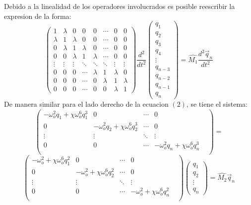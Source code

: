 \documentclass[11pt,letterpaper,twocolumn]{article}
\begin{document}
\par 
Debido a la linealidad de los operadores involucrados es posible reescribir la expresion de la forma: 
{\fontsize{8}{15}\selectfont
\begin{equation}
\left(
\begin{matrix}
1 & \lambda  & 0 & 0 & 0 & \cdots & 0 & 0 \\
\lambda & 1 & \lambda  & 0 & 0 & \cdots & 0 & 0\\
0 & \lambda  & 1 & \lambda   & 0 & \cdots & 0& 0 \\
0 & 0 & \lambda  & 1 & \lambda   & \cdots & 0 & 0 \\
\vdots & \vdots & \vdots & \ddots & \ddots & \ddots & \vdots & \vdots \\
0 & 0 & 0 & \cdots & \lambda  &  1 & \lambda &0\\    
0 & 0 & 0 & \cdots & 0 & \lambda  & 1 & \lambda\\    
0 & 0 & 0 & \cdots & 0 & 0 & \lambda  & 1    
\end{matrix} \right) \dfrac{d^2}{dt^2} \left(
\begin{matrix}
q_{1}\\
q_{2}\\
q_{3}\\
q_{4}\\
\vdots\\
q_{n-3}\\
q_{n-2}\\
q_{n-1}\\
q_{n}
\end{matrix} \right)  = \hat{M_{1}} \dfrac{d^{2} \vec{q}_{n}}{dt^{2}}
\end{equation} } 
De manera similar para el lado derecho de la ecuacion $(2)$, se tiene el sistema: 
{\fontsize{8}{15}\selectfont
$$ \left(
\begin{matrix}
- \omega_{o}^{2} q_{1} + \chi \omega_{o}^{6} q_{1}^{3} & 0 & \cdots & 0 \\
0  & - \omega_{o}^{2} q_{2} + \chi \omega_{o}^{6} q_{2}^{3} & \cdots & 0 \\
\vdots & \vdots  & \ddots & \vdots & \\
0 & 0 & \cdots &- \omega_{o}^{2} q_{n} + \chi \omega_{o}^{6} q_{n}^{3}\\     
\end{matrix} \right) = $$ }
{\fontsize{6}{15}\selectfont
\begin{equation}
\left(
\begin{matrix}
- \omega_{o}^{2} + \chi \omega_{o}^{6} q_{1}^{2} & 0 & \cdots & 0 \\
0  & - \omega_{o}^{2} + \chi \omega_{o}^{6} q_{2}^{2} & \cdots & 0 \\
\vdots & \vdots  & \ddots & \vdots & \\
0 & 0 & \cdots &- \omega_{o}^{2} + \chi \omega_{o}^{6} q_{n}^{2}\\     
\end{matrix} \right) \left( \begin{matrix}
q_{1}\\
q_{2}\\
\vdots\\
q_{n}
\end{matrix} \right) = \hat{M_{2}} \vec{q}_{n}
\end{equation}
}
\end{document}
